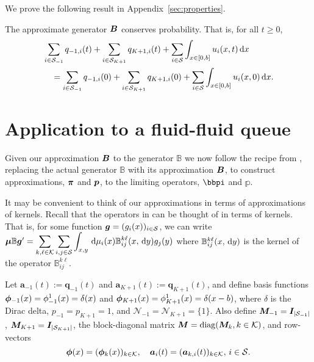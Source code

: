 
We prove the following result in Appendix~\ref{sec:properties}.
\begin{cor} \label{cor: googgy}
	The approximate generator \( \boldsymbol B\) conserves probability. That is, for all \(t\geq 0\),
	\begin{align*}
	\begin{multlined}[t]\sum_{i\in\calS_{-1}}q_{{-1},i}(t)+\sum_{i\in\calS_{K+1}}q_{{K+1},i}(t)+\sum_{i\in\calS} \int_{x\in[0,b]}u_i(x,t)\wrt x 
	\\= \sum_{i\in\calS_{-1}}q_{{-1},i}(0)+\sum_{i\in\calS_{K+1}}q_{{K+1},i}(0)+\sum_{i\in\calS} \int_{x\in[0,b]}u_i(x,0)\wrt x.\end{multlined}
	\end{align*}
\end{cor}


\section{Application to a fluid-fluid queue}\label{sec:DGSFFM}
Given our approximation \(\boldsymbol B\) to the generator \(\mathbb B\) we now follow the recipe from \cite{bo2014}, replacing the actual generator \(\mathbb B\) with its approximation \({  \boldsymbol B}\), to construct approximations, \(\boldsymbol \pi\) and \(\boldsymbol p\), to the limiting operators, \(\bbpi\) and \(\mathbb p\).

It may be convenient to think of our approximations in terms of approximations of kernels. Recall that the operators in \citep{bo2014} can be thought of in terms of kernels. That is, for some function \(\boldsymbol g = (g_i(x))_{i\in\mathcal{S}}\), we can write \(\boldsymbol \mu \mathbb B \boldsymbol g'{} = \displaystyle \sum\limits_{k,\ell\in\mathcal K}\sum\limits_{i,j\in\mathcal{S}} \displaystyle \int_{x,y}\, \mathrm{d} \mu_i(x) \mathbb B_{ij}^{k\ell}(x,\, \mathrm{d} y)g_j(y)\) where \(\mathbb B_{ij}^{k\ell}(x,\, \mathrm{d} y)\) is the kernel of the operator \(\mathbb B_{ij}^{k\ell}\). 

Let \(\boldsymbol a_{-1}(t):=\boldsymbol q_{-1}(t)\) and \(\boldsymbol a_{K+1}(t):=\boldsymbol q_{K+1}(t)\), and define basis functions \(\boldsymbol\phi_{-1}(x) = \phi_{-1}^1(x) = \delta(x)\) and \(\boldsymbol\phi_{K+1}(x) = \phi_{K+1}^1(x) = \delta(x-b)\), where \(\delta\) is the Dirac delta, \(p_{-1} = p_{K+1} = 1\), and \(\mathcal N_{-1} = \mathcal N_{K+1} = \{1\}\). Also define \({\boldsymbol M}_{-1}=\boldsymbol I_{|\mathcal{S}_{-1}|}\), \({\boldsymbol M}_{K+1}=\boldsymbol I_{|\mathcal{S}_{K+1}|}\), the block-diagonal matrix \(\boldsymbol M=\mathrm{diag}(\boldsymbol M_k,k\in\mathcal K)\), and row-vectors 
\[\boldsymbol \phi(x) = (\boldsymbol\phi_k(x))_{k\in\mathcal K}, \quad \boldsymbol a_i(t) = (\boldsymbol a_{k,i}(t))_{k\in\mathcal K},\,i\in\mathcal{S}.\]

